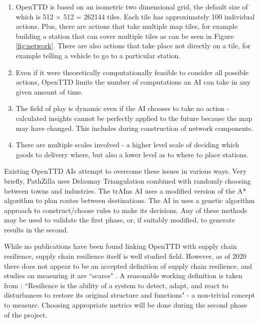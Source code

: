 \documentclass[a4paper,11pt]{article}
\begin{document}
\begin{enumerate}

\item OpenTTD is based on an isometric two dimensional grid, the default size of which is 512 $\times$ 512 = 262144 tiles. Each tile has approximately 100 individual actions. Plus, there are actions that take multiple map tiles, for example building a station that can cover multiple tiles as can be seen in Figure \ref{fig:network}. There are also actions that take place not directly on a tile, for example telling a vehicle to go to a particular station.

\item Even if it were theoretically computationally feasible to consider all possible actions, OpenTTD limits the number of computations an AI can take in any given amount of time.

\item The field of play is dynamic even if the AI chooses to take no action - calculated insights cannot be perfectly applied to the future because the map may have changed. This includes during construction of network components.

\item There are multiple scales involved - a higher level scale of deciding which goods to delivery where, but also a lower level as to where to place stations.

\end{enumerate}

Existing OpenTTD AIs attempt to overcome these issues in various ways. Very briefly, PathZilla \cite{pathzilla} uses Delaunay Triangulation combined with randomly choosing between towns and industries. The trAIns \cite{rios_trains_2009}  AI uses a modified version of the A* algorithm to plan routes between destinations. The AI in \cite{bijlsma2014evolving} uses a genetic algorithm approach to construct/choose rules to make its decisions. Any of these methods may be used to validate the first phase, or, if suitably modified, to generate results in the second.

While no publications have been found linking OpenTTD with supply chain resilience, supply chain resilience itself is well studied field. However, as of 2020 there does not appear to be an accepted definition of supply chain resilience, and studies on measuring it are ``scarce" \cite{doi:10.1080/00207543.2020.1785034}. A reasonable working definition is taken from \cite{kiers_which_2022}: ``Resilience is the ability of a system to detect, adapt, and react to disturbances to restore its original structure and functions" - a non-trivial concept to measure. Choosing appropriate metrics will be done during the second phase of the project.
\end{document}
